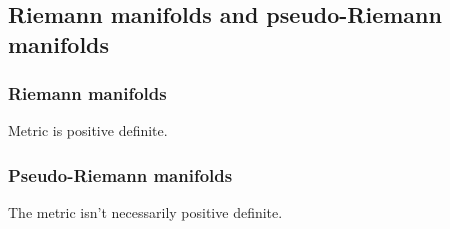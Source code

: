 
\subsection{Riemann manifolds and pseudo-Riemann manifolds}

\subsubsection{Riemann manifolds}

Metric is positive definite.

\subsubsection{Pseudo-Riemann manifolds}

The metric isn't necessarily positive definite.

